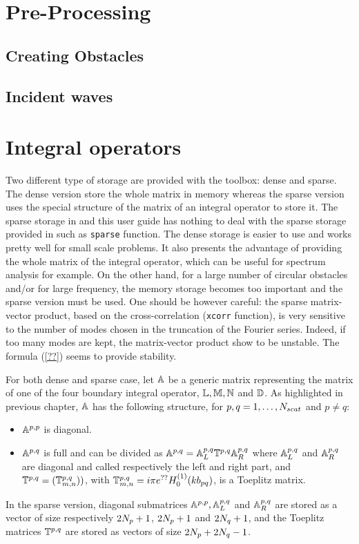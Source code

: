\section{Pre-Processing}
\subsection{Creating Obstacles}
\subsection{Incident waves}

\section{Integral operators}

Two different type of storage are provided with the \mudiff toolbox: dense and sparse. The dense version store the whole matrix in memory whereas the sparse version uses the special structure of the matrix of an integral operator to store it. The sparse storage in \mudiff and this user guide has nothing to deal with the sparse storage provided in \matlab such as \texttt{sparse} function. The dense storage is easier to use and works pretty well for small scale problems. It also presents the advantage of providing the whole matrix of the integral operator, which can be useful for spectrum analysis for example. On the other hand, for a large number of circular obstacles and/or for large frequency, the memory storage becomes too important and the sparse version must be used. One should be however careful: the sparse matrix-vector product, based on the cross-correlation (\texttt{xcorr} \matlab function), is very sensitive to the number of modes chosen in the truncation of the Fourier series. Indeed, if too many modes are kept, the matrix-vector product show to be unstable. The formula (\ref{??}) seems to provide stability.

For both dense and sparse case, let ${\mathbb{A}}$ be a generic matrix representing the matrix of one of the four boundary integral operator, ${\mathbb{L}},{\mathbb{M}},{\mathbb{N}}$ and ${\mathbb{D}}$. As highlighted in previous chapter, ${\mathbb{A}}$ has the following structure, for $p,q=1,\ldots,N_{scat}$ and $p\neq q$:
\begin{itemize}
\item $\mathbb{A}^{p,p}$ is diagonal.
\item $\mathbb{A}^{p,q}$ is full and can be divided as $\mathbb{A}^{p,q} = {\mathbb{A}}_L^{p,q}\mathbb{T}^{p,q}{\mathbb{A}}_R^{p,q}$ where ${\mathbb{A}}_L^{p,q}$ and ${\mathbb{A}}_R^{p,q}$ are diagonal and called respectively the left and right part, and $\mathbb{T}^{p,q} = (\mathbb{T}^{p,q}_{m,n}))$, with $\mathbb{T}^{p,q}_{m,n} = i\pi e^{??}H_0^{(1)}(kb_{pq})$, is a Toeplitz matrix.
\end{itemize}
In the sparse version, diagonal submatrices $\mathbb{A}^{p,p},{\mathbb{A}}_L^{p,q}$ and ${\mathbb{A}}_R^{p,q}$  are stored as a vector of size respectively $2N_{p}+1$, $2N_{p}+1$ and $2N_{q}+1$, and the Toeplitz matrices $\mathbb{T}^{p,q}$ are stored as vectors of size $2N_{p}+2N_{q}-1$.

